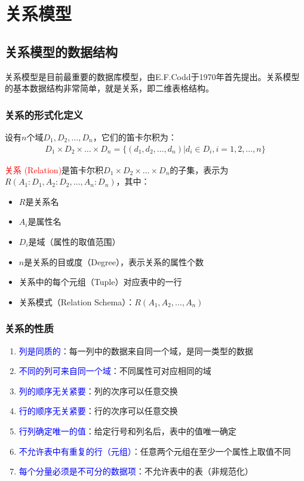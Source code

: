 \documentclass{../../note}
\begin{document}
\section{关系模型}

\subsection{关系模型的数据结构}

关系模型是目前最重要的数据库模型，由E.F.Codd于1970年首先提出。关系模型的基本数据结构非常简单，就是关系，即二维表格结构。

\subsubsection{关系的形式化定义}

设有$n$个域$D_1, D_2, \ldots, D_n$，它们的笛卡尔积为：
\begin{align}
  D_1 \times D_2 \times \ldots \times D_n = \{(d_1, d_2, \ldots, d_n) | d_i \in D_i, i = 1, 2, \ldots, n\}
\end{align}

\textcolor{red}{关系 (Relation)}是笛卡尔积$D_1 \times D_2 \times \ldots \times D_n$的子集，表示为$R(A_1:D_1, A_2:D_2, \ldots, A_n:D_n)$，其中：
\begin{itemize}
  \item $R$是关系名
  \item $A_i$是属性名
  \item $D_i$是域（属性的取值范围）
  \item $n$是关系的目或度（Degree），表示关系的属性个数
  \item 关系中的每个元组（Tuple）对应表中的一行
  \item 关系模式（Relation Schema）：$R(A_1, A_2, \ldots, A_n)$
\end{itemize}

\subsubsection{关系的性质}

\begin{enumerate}
  \item \textcolor{blue}{列是同质的}：每一列中的数据来自同一个域，是同一类型的数据
  \item \textcolor{blue}{不同的列可来自同一个域}：不同属性可对应相同的域
  \item \textcolor{blue}{列的顺序无关紧要}：列的次序可以任意交换
  \item \textcolor{blue}{行的顺序无关紧要}：行的次序可以任意交换
  \item \textcolor{blue}{行列确定唯一的值}：给定行号和列名后，表中的值唯一确定
  \item \textcolor{blue}{不允许表中有重复的行（元组）}：任意两个元组在至少一个属性上取值不同
  \item \textcolor{blue}{每个分量必须是不可分的数据项}：不允许表中的表（非规范化）
\end{enumerate}
\end{document}
